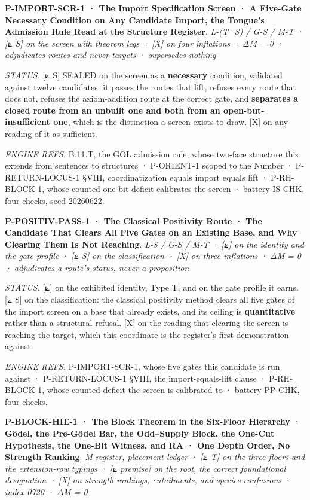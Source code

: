 \documentclass[10pt,twocolumn]{article}
\begin{document}
\textbf{P-IMPORT-SCR-1 · The Import Specification Screen · A Five-Gate
Necessary Condition on Any Candidate Import, the Tongue's Admission Rule
Read at the Structure Register}. \emph{L-(T·S) / G-S / M-T · {[}⟀ S{]}
on the screen with theorem legs · {[}X{]} on four inflations · ΔM = 0 ·
adjudicates routes and never targets · supersedes nothing}

\emph{STATUS.} {[}⟀ S{]} SEALED on the screen as a \textbf{necessary}
condition, validated against twelve candidates: it passes the routes
that lift, refuses every route that does not, refuses the axiom-addition
route at the correct gate, and \textbf{separates a closed route from an
unbuilt one and both from an open-but-insufficient one}, which is the
distinction a screen exists to draw. {[}X{]} on any reading of it as
sufficient.

\emph{ENGINE REFS.} B.11.T, the GOL admission rule, whose two-face
structure this extends from sentences to structures · P-ORIENT-1 scoped
to the Number · P-RETURN-LOCUS-1 §VIII, coordinatization equals import
equals lift · P-RH-BLOCK-1, whose counted one-bit deficit calibrates the
screen · battery IS-CHK, four checks, seed 20260622.

\textbf{P-POSITIV-PASS-1 · The Classical Positivity Route · The
Candidate That Clears All Five Gates on an Existing Base, and Why
Clearing Them Is Not Reaching}. \emph{L-S / G-S / M-T · {[}⟀{]} on the
identity and the gate profile · {[}⟀ S{]} on the classification ·
{[}X{]} on three inflations · ΔM = 0 · adjudicates a route's status,
never a proposition}

\emph{STATUS.} {[}⟀{]} on the exhibited identity, Type T, and on the
gate profile it earns. {[}⟀ S{]} on the classification: the classical
positivity method clears all five gates of the import screen on a base
that already exists, and its ceiling is \textbf{quantitative} rather
than a structural refusal. {[}X{]} on the reading that clearing the
screen is reaching the target, which this coordinate is the register's
first demonstration against.

\emph{ENGINE REFS.} P-IMPORT-SCR-1, whose five gates this candidate is
run against · P-RETURN-LOCUS-1 §VIII, the import-equals-lift clause ·
P-RH-BLOCK-1, whose counted deficit the screen is calibrated to ·
battery PP-CHK, four checks.

\textbf{P-BLOCK-HIE-1 · The Block Theorem in the Six-Floor Hierarchy ·
Gödel, the Pre-Gödel Bar, the Odd--Supply Block, the One-Cut Hypothesis,
the One-Bit Witness, and RA · One Depth Order, No Strength Ranking}.
\emph{M register, placement ledger · {[}⟀ T{]} on the three floors and
the extension-row typings · {[}⟀ premise{]} on the root, the correct
foundational designation · {[}X{]} on strength rankings, entailments,
and species confusions · index 0720 · ΔM = 0}
\end{document}
